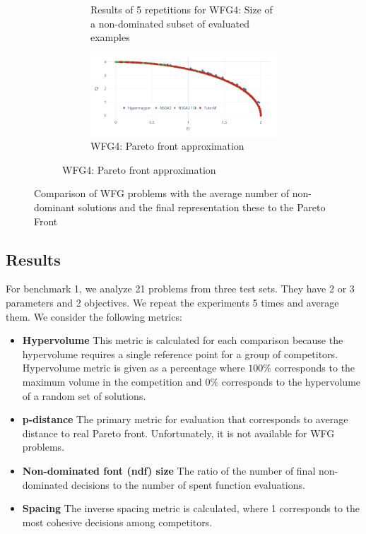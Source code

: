 \begin{figure}[!h]
\begin{subfigure}{\textwidth}
\begin{subfigure}{0.5\textwidth}
                \caption{Results of 5 repetitions for WFG4: Size of a non-dominated subset of evaluated examples}
                \label{fig:wfg4_ndf}
            \end{subfigure} 
            \begin{subfigure}{0.5\textwidth}
                \includegraphics[width=\textwidth]{content/images/wfg4_front}
                \caption{WFG4: Pareto front approximation}
                \label{fig:wfg4_front}
            \end{subfigure}
        \end{subfigure} 
        \caption[Comparison of WFG problems with the average number of non-dominant solutions and the final representation these to the Pareto Front.]{Comparison of WFG problems with the average number of non-dominant solutions and the final representation these to the Pareto Front}
        \label{fig:wfg14}    
    \end{figure}

    \subsection*{Results}

    For benchmark 1, we analyze 21 problems from three test sets. They have 2 or 3 parameters and 2 objectives. We repeat the experiments 5 times and average them. We consider the following metrics:
    \begin{itemize}
        \item \textbf{Hypervolume} This metric is calculated for each comparison because the hypervolume requires a single reference point for a group of competitors. Hypervolume metric is given as a percentage where $100\%$ corresponds to the maximum volume in the competition and $0\%$ corresponds to the hypervolume of a random set of solutions.
        \item \textbf{p-distance} The primary metric for evaluation that corresponds to average distance to real Pareto front. Unfortunately, it is not available for WFG problems.
        \item \textbf{Non-dominated font (ndf) size} The ratio of the number of final non-dominated decisions to the number of spent function evaluations.
        \item \textbf{Spacing} The inverse spacing metric is calculated, where 1 corresponds to the most cohesive decisions among competitors.
    \end{itemize}

